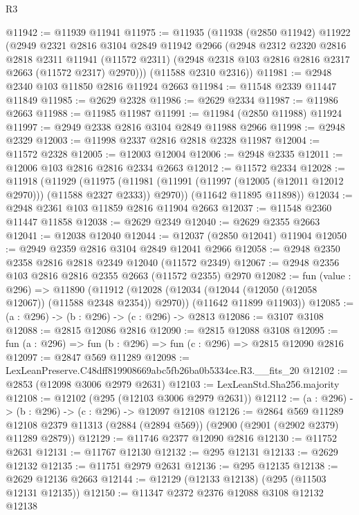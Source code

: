 \begin{lexlean}{R3}
\begin{coremodule}
@11942 := @11939 @11941
@11975 := @11935
    (@11938
      (@2850 @11942)
      @11922
      (@2949
        @2321
        @2816
        @3104
        @2849
        @11942
        @2966
        (@2948
          @2312
          @2320
          @2816
          @2818
          @2311
          @11941
          (@11572 @2311)
          (@2948 @2318 @103 @2816 @2816 @2317 @2663 (@11572 @2317) @2970)))
      (@11588 @2310 @2316))
@11981 := @2948 @2340 @103 @11850 @2816 @11924 @2663
@11984 := @11548 @2339 @11447 @11849
@11985 := @2629 @2328
@11986 := @2629 @2334
@11987 := @11986 @2663
@11988 := @11985 @11987
@11991 := @11984 (@2850 @11988) @11924
@11997 := @2949 @2338 @2816 @3104 @2849 @11988 @2966
@11998 := @2948 @2329
@12003 := @11998 @2337 @2816 @2818 @2328 @11987
@12004 := @11572 @2328
@12005 := @12003 @12004
@12006 := @2948 @2335
@12011 := @12006 @103 @2816 @2816 @2334 @2663
@12012 := @11572 @2334
@12028 := @11918
    (@11929
      (@11975 (@11981 (@11991 (@11997 (@12005 (@12011 @12012 @2970))) (@11588 @2327 @2333)) @2970))
      (@11642 @11895 @11898))
@12034 := @2948 @2361 @103 @11859 @2816 @11904 @2663
@12037 := @11548 @2360 @11447 @11858
@12038 := @2629 @2349
@12040 := @2629 @2355 @2663
@12041 := @12038 @12040
@12044 := @12037 (@2850 @12041) @11904
@12050 := @2949 @2359 @2816 @3104 @2849 @12041 @2966
@12058 := @2948 @2350 @2358 @2816 @2818 @2349 @12040 (@11572 @2349)
@12067 := @2948 @2356 @103 @2816 @2816 @2355 @2663 (@11572 @2355) @2970
@12082 := fun (value : @296) =>
  @11890
    (@11912
      (@12028 (@12034 (@12044 (@12050 (@12058 @12067)) (@11588 @2348 @2354)) @2970))
      (@11642 @11899 @11903))
@12085 := (a : @296) -> (b : @296) -> (c : @296) -> @2813
@12086 := @3107 @3108
@12088 := @2815 @12086 @2816
@12090 := @2815 @12088 @3108
@12095 := fun (a : @296) => fun (b : @296) => fun (c : @296) => @2815 @12090 @2816
@12097 := @2847 @569 @11289
@12098 := LexLeanPreserve.C48dff819908669abc5fb26ba0b5334ce.R3.__fits_20
@12102 := @2853 (@12098 @3006 @2979 @2631)
@12103 := LexLeanStd.Sha256.majority
@12108 := @12102 (@295 (@12103 @3006 @2979 @2631))
@12112 := (a : @296) -> (b : @296) -> (c : @296) -> @12097 @12108
@12126 := @2864
    @569
    @11289
    @12108
    @2379
    @11313
    (@2884 (@2894 @569))
    (@2900 (@2901 (@2902 @2379) @11289 @2879))
@12129 := @11746 @2377 @12090 @2816
@12130 := @11752 @2631
@12131 := @11767 @12130
@12132 := @295 @12131
@12133 := @2629 @12132
@12135 := @11751 @2979 @2631
@12136 := @295 @12135
@12138 := @2629 @12136 @2663
@12144 := @12129 (@12133 @12138) (@295 (@11503 @12131 @12135))
@12150 := @11347 @2372 @2376 @12088 @3108 @12132 @12138

\end{coremodule}
\end{lexlean}
